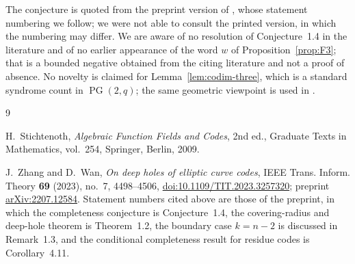 \documentclass[11pt]{amsart}
\newcommand{\PG}{\operatorname{PG}}
\begin{document}
The conjecture is quoted from the preprint version of \cite{ZhangWan},
whose statement numbering we follow; we were not able to consult the
printed version, in which the numbering may differ. We are aware of no
resolution of Conjecture~1.4 in the literature and of no earlier
appearance of the word $w$ of Proposition~\ref{prop:F3}; that is a
bounded negative obtained from the citing literature and not a proof of
absence. No novelty is claimed for Lemma~\ref{lem:codim-three}, which is
a standard syndrome count in $\PG(2,q)$; the same geometric viewpoint is
used in \cite[Proposition~4.9]{ZhangWan}.

\begin{thebibliography}{9}

H.~Stichtenoth,
\emph{Algebraic Function Fields and Codes}, 2nd ed.,
Graduate Texts in Mathematics, vol.~254,
Springer, Berlin, 2009.

J.~Zhang and D.~Wan,
\emph{On deep holes of elliptic curve codes},
IEEE Trans. Inform. Theory \textbf{69} (2023), no.~7, 4498--4506,
\href{https://doi.org/10.1109/TIT.2023.3257320}
{doi:10.1109/TIT.2023.3257320};
preprint \href{https://arxiv.org/abs/2207.12584}{arXiv:2207.12584}.
Statement numbers cited above are those of the preprint, in which the
completeness conjecture is Conjecture~1.4, the covering-radius and
deep-hole theorem is Theorem~1.2, the boundary case $k=n-2$ is discussed
in Remark~1.3, and the conditional completeness result for residue codes
is Corollary~4.11.

\end{thebibliography}
\end{document}
